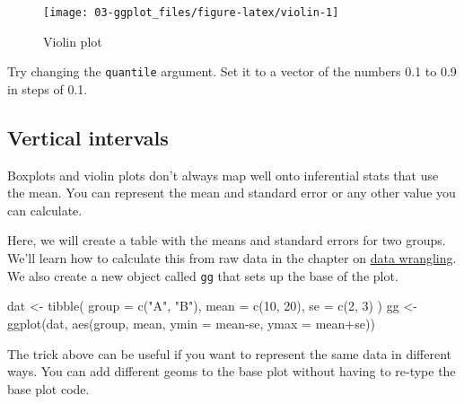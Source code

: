 \documentclass[
  oneside]{book}
\newenvironment{Shaded}{\begin{snugshade}}{\end{snugshade}}
\newcommand{\AttributeTok}[1]{\textcolor[rgb]{0.77,0.63,0.00}{#1}}
\newcommand{\DecValTok}[1]{\textcolor[rgb]{0.00,0.00,0.81}{#1}}
\newcommand{\FunctionTok}[1]{\textcolor[rgb]{0.00,0.00,0.00}{#1}}
\newcommand{\NormalTok}[1]{#1}
\newcommand{\OtherTok}[1]{\textcolor[rgb]{0.56,0.35,0.01}{#1}}
\newcommand{\SpecialCharTok}[1]{\textcolor[rgb]{0.00,0.00,0.00}{#1}}
\newcommand{\StringTok}[1]{\textcolor[rgb]{0.31,0.60,0.02}{#1}}
\begin{document}
\begin{figure}

{\centering \texttt{[image: 03-ggplot\_files/figure-latex/violin-1]} 

}

\caption{Violin plot}\label{fig:violin}
\end{figure}

\begin{try}
Try changing the \texttt{quantile} argument. Set it to a vector of the numbers 0.1 to 0.9 in steps of 0.1.

\end{try}

\hypertarget{vertical_intervals}{%
\subsection{Vertical intervals}\label{vertical_intervals}}

Boxplots and violin plots don't always map well onto inferential stats that use the mean. You can represent the mean and standard error or any other value you can calculate.

Here, we will create a table with the means and standard errors for two groups. We'll learn how to calculate this from raw data in the chapter on \protect\hyperlink{dplyr}{data wrangling}. We also create a new object called \texttt{gg} that sets up the base of the plot.

\begin{Shaded}
\begin{Highlighting}[]
\NormalTok{dat }\OtherTok{\textless{}{-}} \FunctionTok{tibble}\NormalTok{(}
  \AttributeTok{group =} \FunctionTok{c}\NormalTok{(}\StringTok{"A"}\NormalTok{, }\StringTok{"B"}\NormalTok{),}
  \AttributeTok{mean =} \FunctionTok{c}\NormalTok{(}\DecValTok{10}\NormalTok{, }\DecValTok{20}\NormalTok{),}
  \AttributeTok{se =} \FunctionTok{c}\NormalTok{(}\DecValTok{2}\NormalTok{, }\DecValTok{3}\NormalTok{)}
\NormalTok{)}
\NormalTok{gg }\OtherTok{\textless{}{-}} \FunctionTok{ggplot}\NormalTok{(dat, }\FunctionTok{aes}\NormalTok{(group, mean, }
                      \AttributeTok{ymin =}\NormalTok{ mean}\SpecialCharTok{{-}}\NormalTok{se, }
                      \AttributeTok{ymax =}\NormalTok{ mean}\SpecialCharTok{+}\NormalTok{se))}
\end{Highlighting}
\end{Shaded}

The trick above can be useful if you want to represent the same data in different ways. You can add different geoms to the base plot without having to re-type the base plot code.
\end{document}
